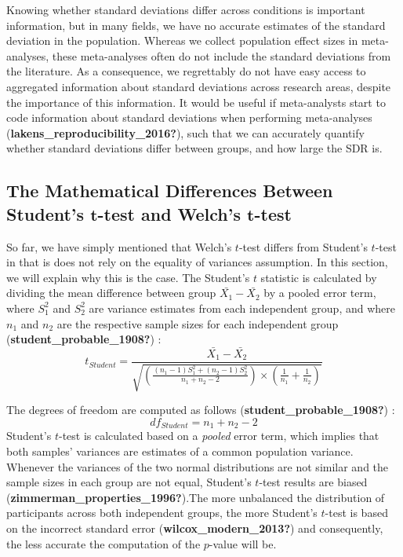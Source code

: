 \documentclass[
  english,
  man]{apa6}
\begin{document}
Knowing whether standard deviations differ across conditions is important information, but in many fields, we have no accurate estimates of the standard deviation in the population. Whereas we collect population effect sizes in meta-analyses, these meta-analyses often do not include the standard deviations from the literature. As a consequence, we regrettably do not have easy access to aggregated information about standard deviations across research areas, despite the importance of this information. It would be useful if meta-analysts start to code information about standard deviations when performing meta-analyses (\textbf{lakens\_reproducibility\_2016?}), such that we can accurately quantify whether standard deviations differ between groups, and how large the SDR is.

\hypertarget{the-mathematical-differences-between-students-bmt-test-and-welchs-bmt-test}{%
\subsection{\texorpdfstring{The Mathematical Differences Between Student's \(\bm{t}\)-test and Welch's \(\bm{t}\)-test}{The Mathematical Differences Between Student's \textbackslash bm\{t\}-test and Welch's \textbackslash bm\{t\}-test}}\label{the-mathematical-differences-between-students-bmt-test-and-welchs-bmt-test}}

So far, we have simply mentioned that Welch's \(t\)-test differs from Student's \(t\)-test in that is does not rely on the equality of variances assumption. In this section, we will explain why this is the case. The Student's \(t\) statistic is calculated by dividing the mean difference between group \(\bar{X_1}-\bar{X_2}\) by a pooled error term, where \(S^2_1\) and \(S^2_2\) are variance estimates from each independent group, and where \(n_1\) and \(n_2\) are the respective sample sizes for each independent group (\textbf{student\_probable\_1908?}) :
\begin{equation*} 
t_{Student}=\frac{\bar{X_1}-\bar{X_2}}{\sqrt{ \left(\frac{(n_1-1)S^2_1+(n_2-1)S^2_2}{n_1+n_2-2}\right) \times \left(\frac{1}{n_1}+\frac{1}{n_2}\right)}}
\label{eqn:Student}
\end{equation*}

The degrees of freedom are computed as follows (\textbf{student\_probable\_1908?}) :
\begin{equation*} 
df_{Student}=n_1+n_2-2
\label{eqn:dfStudent}
\end{equation*}
Student's \(t\)-test is calculated based on a \emph{pooled} error term, which implies that both samples' variances are estimates of a common population variance. Whenever the variances of the two normal distributions are not similar and the sample sizes in each group are not equal, Student's \(t\)-test results are biased (\textbf{zimmerman\_properties\_1996?}).The more unbalanced the distribution of participants across both independent groups, the more Student's \(t\)-test is based on the incorrect standard error (\textbf{wilcox\_modern\_2013?}) and consequently, the less accurate the computation of the \(p\)-value will be.
\end{document}
